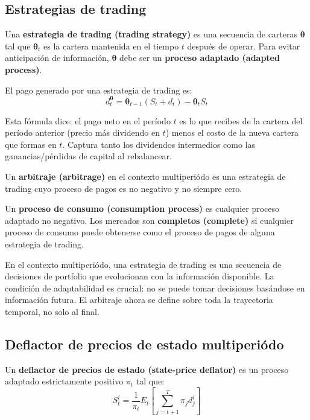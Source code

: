 \documentclass[12pt]{article}
\begin{document}
\subsection{Estrategias de trading}

Una \textbf{estrategia de trading (trading strategy)} es una secuencia de carteras $\boldsymbol{\theta}$ tal que $\boldsymbol{\theta}_t$ es la cartera mantenida en el tiempo $t$ despu\'es de operar. Para evitar anticipaci\'on de informaci\'on, $\boldsymbol{\theta}$ debe ser un \textbf{proceso adaptado (adapted process)}.

El pago generado por una estrategia de trading es:
\begin{equation}
    d_t^{\boldsymbol{\theta}} = \boldsymbol{\theta}_{t-1}(S_t + d_t) - \boldsymbol{\theta}_t S_t
\end{equation}

\begin{intuicionmat}
Esta f\'ormula dice: el pago neto en el per\'iodo $t$ es lo que recibes de la cartera del per\'iodo anterior (precio m\'as dividendo en $t$) menos el costo de la nueva cartera que formas en $t$. Captura tanto los dividendos intermedios como las ganancias/p\'erdidas de capital al rebalancear.
\end{intuicionmat}

Un \textbf{arbitraje (arbitrage)} en el contexto multiperi\'odo es una estrategia de trading cuyo proceso de pagos es no negativo y no siempre cero.

Un \textbf{proceso de consumo (consumption process)} es cualquier proceso adaptado no negativo. Los mercados son \textbf{completos (complete)} si cualquier proceso de consumo puede obtenerse como el proceso de pagos de alguna estrategia de trading.

\begin{intuicion}
En el contexto multiperi\'odo, una estrategia de trading es una secuencia de decisiones de portfolio que evolucionan con la informaci\'on disponible. La condici\'on de adaptabilidad es crucial: no se puede tomar decisiones bas\'andose en informaci\'on futura. El arbitraje ahora se define sobre toda la trayectoria temporal, no solo al final.
\end{intuicion}

\subsection{Deflactor de precios de estado multiperi\'odo}

Un \textbf{deflactor de precios de estado (state-price deflator)} es un proceso adaptado estrictamente positivo $\pi_t$ tal que:
\begin{equation}
    S_t^i = \frac{1}{\pi_t} E_t\left[\sum_{j=t+1}^{T} \pi_j d_j^i\right]
\end{equation}
\end{document}
